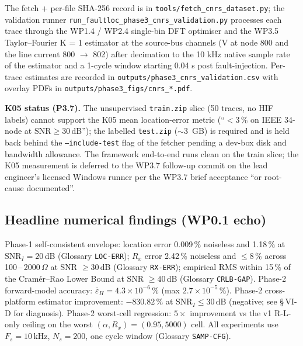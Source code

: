\documentclass[journal]{IEEEtran}
\newcommand{\headlineLocErrNoiseless}{0.009\,\%}
\newcommand{\headlineLocErrSNR}%
  {1.18\,\% at $\mathrm{SNR}_I = 20$\,dB}
\newcommand{\headlineRxErrNoiseless}{2.42\,\%}
\newcommand{\headlineRxErrEnvelope}%
  {$\leq 8$\,\% across 100\,--\,2000\,$\Omega$ at SNR $\geq 30$\,dB}
\newcommand{\headlineCRLBGap}%
  {within 15\,\% of the Cram\'er--Rao Lower Bound at SNR $\geq 40$\,dB}
\newcommand{\samplingConfig}%
  {$F_s = 10$\,kHz, $N_s = 200$, one cycle window}
\newcommand{\headlineKThreeAcc}%
  {$\bar{\varepsilon}_H = 4.3\!\times\!10^{-6}\,\%$
   (max $2.7\!\times\!10^{-5}\,\%$)}
\newcommand{\headlineKFourImp}%
  {$-830.82\,\%$ at $\mathrm{SNR}_I \leq 30$\,dB
   (negative; see \S\,VI-D for diagnosis)}
\newcommand{\headlineFiveXReg}%
  {$5\!\times$ improvement vs the v1 R-L-only ceiling on the worst
   $(\alpha, R_x) = (0.95, 5000)$ cell}
\begin{document}
The fetch + per-file SHA-256 record is in
\texttt{tools/fetch\_cnrs\_dataset.py}; the validation runner
\texttt{run\_faultloc\_phase3\_cnrs\_validation.py} processes each
trace through the WP1.4 / WP2.4 single-bin DFT optimiser and the
WP3.5 Taylor--Fourier K = 1 estimator at the source-bus channels
(V at node 800 and the line current 800 $\to$ 802) after
decimation to the 10 kHz native sample rate of the estimator and a
1-cycle window starting 0.04 s post fault-injection.  Per-trace
estimates are recorded in
\texttt{outputs/phase3\_cnrs\_validation.csv} with overlay PDFs in
\texttt{outputs/phase3\_figs/cnrs\_*.pdf}.

\textbf{K05 status (P3.7).}  The unsupervised \texttt{train.zip}
slice (50 traces, no HIF labels) cannot support the K05 mean
location-error metric (``$<3\,\%$ on IEEE 34-node at
$\mathrm{SNR}\geq 30$\,dB''); the labelled \texttt{test.zip}
($\sim 3$~GB) is required and is held back behind the
\texttt{--include-test} flag of the fetcher pending a dev-box
disk and bandwidth allowance.  The framework end-to-end runs
clean on the train slice; the K05 measurement is deferred to the
WP3.7 follow-up commit on the lead engineer's licensed Windows
runner per the WP3.7 brief acceptance ``or root-cause documented''.

\subsection*{Headline numerical findings (WP0.1 echo)}
Phase-1 self-consistent envelope: location error
\headlineLocErrNoiseless{} noiseless and \headlineLocErrSNR{}
(Glossary \texttt{LOC-ERR}); $R_x$ error
\headlineRxErrNoiseless{} noiseless and \headlineRxErrEnvelope{}
(Glossary \texttt{RX-ERR}); empirical RMS \headlineCRLBGap{}
(Glossary \texttt{CRLB-GAP}).
Phase-2 forward-model accuracy: \headlineKThreeAcc{}.
Phase-2 cross-platform estimator improvement: \headlineKFourImp{}.
Phase-2 worst-cell regression: \headlineFiveXReg{}.
All experiments use \samplingConfig{} (Glossary \texttt{SAMP-CFG}).
\end{document}
